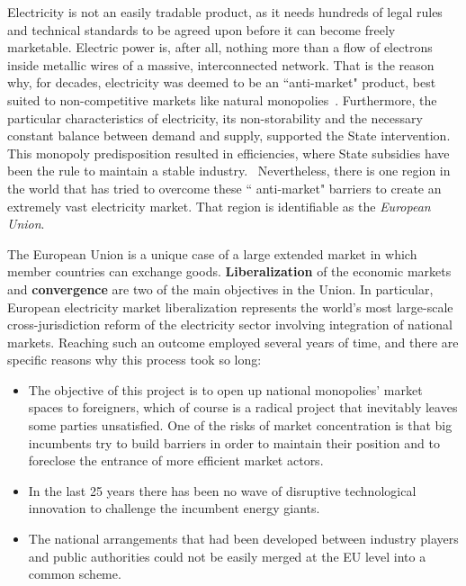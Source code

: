 \documentclass[a4paper,12pt]{book}
\begin{document}
Electricity is not an easily tradable product, as it needs hundreds of  legal rules and technical standards to be agreed upon before it can become freely marketable. Electric power is, after all, nothing more than a flow of electrons inside metallic wires of a massive, interconnected network. That is the reason why, for decades, electricity was deemed to be an ``anti-market" product, best suited to non-competitive markets like natural monopolies~\cite{glachant2014eu}. Furthermore, the particular characteristics of electricity, its non-storability and the necessary constant balance between demand and supply, supported the State intervention. This monopoly predisposition resulted in efficiencies, where State subsidies have been the rule to maintain a stable industry.~\cite{domanico2007concentration} Nevertheless, there is one region in the world that has tried to overcome these `` anti-market" barriers to create an extremely vast electricity market. That region is identifiable as the \textit{European Union}.

The European Union is a unique case of a large extended market in which member countries can exchange goods.  \textbf{Liberalization} of the economic markets and \textbf{convergence} are two of the main objectives in the Union. In particular, European electricity market liberalization represents the world's most large-scale cross-jurisdiction reform of the electricity sector involving integration of national markets. Reaching such an outcome employed several years of time, and there are specific reasons why this process took so long:

\begin{itemize}

\item The objective of this project is to open up national monopolies’ market spaces to foreigners, which of course is a radical
project that inevitably leaves some parties unsatisfied.  One of the risks of market concentration is that big incumbents try to build
barriers in order to maintain their position and to foreclose the entrance of more efficient market actors.~\cite{ringel2003liberalising}

\item In the last 25 years there has been no wave of disruptive technological innovation to challenge the incumbent energy
giants.

\item The national arrangements that had been developed between industry players and public authorities could not be easily merged at the EU level into a common scheme.
\end{itemize}
\end{document}
